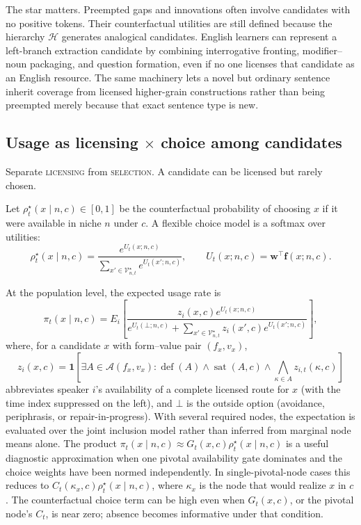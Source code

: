 \documentclass[12pt,letterpaper]{article}
\newcommand{\term}[1]{\textsc{#1}}
\begin{document}
The star matters. Preempted gaps and innovations often involve candidates with no
positive tokens. Their counterfactual utilities are still defined because the
hierarchy $\mathcal{H}$ generates analogical candidates. English learners can
represent a left-branch extraction candidate by combining interrogative
fronting, modifier--noun packaging, and question formation, even if no one
licenses that candidate as an English resource. The same machinery lets a novel
but ordinary sentence inherit coverage from licensed higher-grain constructions
rather than being preempted merely because that exact sentence type is new.

\subsection{Usage as \texorpdfstring{licensing $\times$ choice}{licensing x choice} among candidates}
\label{sec:usage}

Separate \term{licensing} from \term{selection}. A candidate can be licensed but
rarely chosen.

Let $\rho_t^\star(x\mid n,c)\in[0,1]$ be the counterfactual probability of
choosing $x$ if it were available in niche $n$ under $c$. A flexible choice model
is a softmax over utilities:
\[
\rho_t^\star(x\mid n,c)=
\frac{e^{U_t(x;n,c)}}{\sum_{x'\in\mathcal{V}_{n,t}^{\star}}e^{U_t(x';n,c)}},
\qquad
U_t(x;n,c)=\mathbf{w}^{\top}\mathbf{f}(x;n,c).
\]

At the population level, the expected usage rate is
\[
\pi_t(x\mid n,c)=
E_i\!\left[
\frac{z_i(x,c)e^{U_t(x;n,c)}}
{e^{U_t(\bot;n,c)}+
\sum_{x'\in\mathcal{V}_{n,t}^{\star}}z_i(x',c)e^{U_t(x';n,c)}}
\right],
\]
where, for a candidate $x$ with form--value pair $(f_x,v_x)$,
\[
z_i(x,c)=\mathbf{1}\!\left[
\exists A\in\mathcal{A}(f_x,v_x):
\operatorname{def}(A)\wedge\operatorname{sat}(A,c)\wedge
\bigwedge_{\kappa\in A}z_{i,t}(\kappa,c)
\right]
\]
abbreviates speaker $i$'s availability of a complete licensed route for $x$
(with the time index suppressed on the left), and $\bot$ is the outside option
(avoidance, periphrasis, or repair-in-progress). With several required nodes,
the expectation is evaluated over the joint inclusion model rather than inferred
from marginal node means alone. The product
$\pi_t(x\mid n,c)\approx G_t(x,c)\rho_t^\star(x\mid n,c)$ is a useful diagnostic
approximation when one pivotal availability gate dominates and the choice
weights have been normed independently. In single-pivotal-node cases this
reduces to $C_t(\kappa_x,c)\rho_t^\star(x\mid n,c)$, where $\kappa_x$ is the node
that would realize $x$ in $c$. The counterfactual choice term can be high even
when $G_t(x,c)$, or the pivotal node's $C_t$, is near zero; absence becomes
informative under that condition.
\end{document}
